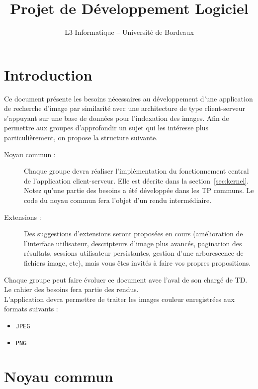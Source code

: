 \documentclass[a4paper,12pt]{article}
\title{\sffamily \textbf{Projet de Développement Logiciel}}
\author{L3 Informatique -- Université de Bordeaux}
\date{}
\newcounter{besoin}
\begin{document}
\maketitle


\section{Introduction}

Ce document présente les besoins nécessaires au développement d'une application
de recherche d'image par similarité avec une architecture de type client-serveur s'appuyant sur une base de données pour l'indexation des images.
Afin de permettre aux groupes d'approfondir un sujet qui les intéresse plus
particulièrement, on propose la structure suivante.

\begin{description}
\item[Noyau commun :] Chaque groupe devra réaliser l'implémentation du fonctionnement central de l'application client-serveur. Elle est décrite dans la section~\ref{sec:kernel}. Notez qu'une partie des besoins a été développée dans les TP communs. Le code du noyau commun fera l'objet d'un rendu intermédiaire.
  
\item [Extensions :] Des suggestions d'extensions seront proposées en cours (amélioration de l'interface utilisateur, descripteurs d'image plus avancés, pagination des résultats, sessions utilisateur persistantes, gestion d'une arborescence de fichiers image, etc), mais vous êtes invités à faire vos propres propositions.
  
\end{description}


Chaque groupe peut faire évoluer ce document avec l'aval de son chargé de TD. Le cahier des besoins fera partie des rendus.\\


L'application devra permettre de traiter les images couleur enregistrées aux formats suivants :

\begin{itemize}
\item \verb!JPEG!
\item \verb!PNG!
\end{itemize}



\section{\label{sec:kernel}Noyau commun}
\end{document}
